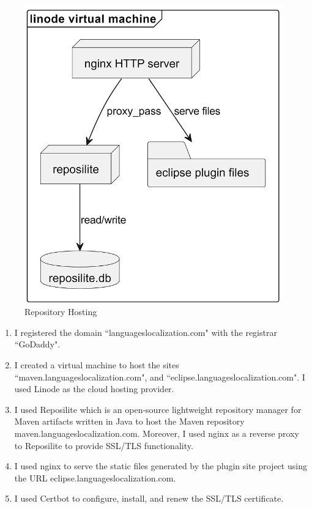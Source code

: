  \begin{figure}[H]
    \centering
    \includegraphics{ch3-images/deployment.png}
    \caption{Repository Hosting}
    \label{fig: Repository Hosting}
 \end{figure}

\begin{enumerate}
    \item I registered the domain ``languageslocalization.com" with the registrar ``GoDaddy".
    \item I created a virtual machine to host the sites ``maven.languageslocalization.com", and ``eclipse.languageslocalization.com". I used Linode as the cloud hosting provider. 
    \item I used Reposilite which is an open-source lightweight repository manager for Maven artifacts written in Java to host the Maven repository maven.languageslocalization.com. Moreover, I used nginx as a reverse proxy to Reposilite to provide \ac{SSL}/\ac{TLS} functionality.
    \item I used nginx to serve the static files generated by the plugin site project using the URL eclipse.languageslocalization.com.
    \item I used Certbot to configure, install, and renew the SSL/TLS certificate.
\end{enumerate}

